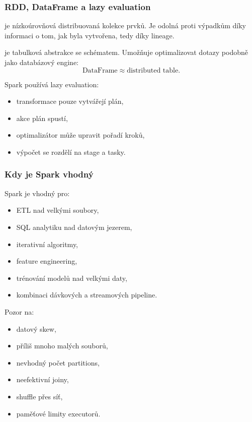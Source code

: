 \subsubsection{RDD, DataFrame a lazy evaluation}

 je nízkoúrovňová distribuovaná kolekce prvků. Je odolná proti výpadkům díky informaci o tom,
jak byla vytvořena, tedy díky lineage.

 je tabulková abstrakce se schématem. Umožňuje optimalizovat dotazy podobně jako databázový
engine:
\[
\text{DataFrame}
\approx
\text{distributed table}.
\]

Spark používá lazy evaluation:
\begin{itemize}
    \item transformace pouze vytvářejí plán,
    \item akce plán spustí,
    \item optimalizátor může upravit pořadí kroků,
    \item výpočet se rozdělí na stage a tasky.
\end{itemize}

\subsubsection{Kdy je Spark vhodný}

Spark je vhodný pro:
\begin{itemize}
    \item ETL nad velkými soubory,
    \item SQL analytiku nad datovým jezerem,
    \item iterativní algoritmy,
    \item feature engineering,
    \item trénování modelů nad velkými daty,
    \item kombinaci dávkových a streamových pipeline.
\end{itemize}

Pozor na:
\begin{itemize}
    \item datový skew,
    \item příliš mnoho malých souborů,
    \item nevhodný počet partitions,
    \item neefektivní joiny,
    \item shuffle přes síť,
    \item paměťové limity executorů.
\end{itemize}

